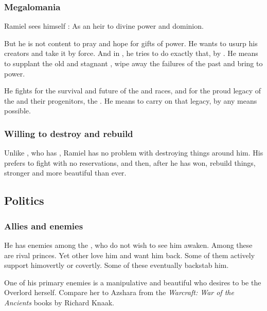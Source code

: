 \subsubsection{Megalomania}
Ramiel sees himself : 
As an heir to divine power and dominion. 

But he is not content to pray and hope for gifts of power. 
He wants to usurp his creators and take it by force. 
And in \SentinelsFinalBook, he tries to do exactly that, by . 
He means to supplant the old and stagnant \banes{}, wipe away the failures of the past and bring  to power. 

He fights for the survival and future of the \resphan{} and \human{} races, and for the proud legacy of the \banes{} and their progenitors, the \voyagers. 
He means to carry on that legacy, by any means possible.





\subsubsection{Willing to destroy and rebuild}
Unlike \Nzessuacrith, who has , Ramiel has no problem with destroying things around him. 
His prefers to fight with no reservations, and then, after he has won, rebuild things, stronger and more beautiful than ever. 









\subsection{Politics}
\subsubsection{Allies and enemies}
He has enemies among the \resphain, who do not wish to see him awaken. Among these are rival \Mystraacht{} princes. Yet other \resphain{} love him and want him back. Some of them actively support him\dash overtly or covertly. Some of these eventually backstab him. 

One of his primary enemies is a manipulative and beautiful \resvil{} who desires to be the \Mystraacht{} Overlord herself. Compare her to Azshara from the \emph{Warcraft: War of the Ancients} books by Richard Knaak. 

